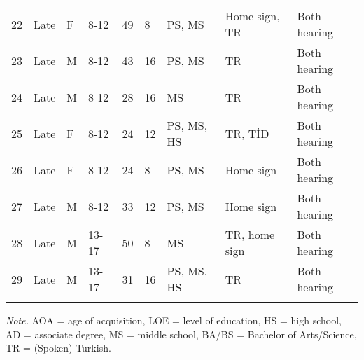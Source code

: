 \begin{appendix}
\begin{table}[h]
\begin{center}
\begin{threeparttable}
{\begin{tabular}{lllllllll}
22 & Late & F & 8-12 & 49 & 8 & PS, MS & Home sign, TR & Both hearing\\
23 & Late & M & 8-12 & 43 & 16 & PS, MS & TR & Both hearing\\
24 & Late & M & 8-12 & 28 & 16 & MS & TR & Both hearing\\
25 & Late & F & 8-12 & 24 & 12 & PS, MS, HS & TR, TİD & Both hearing\\
26 & Late & F & 8-12 & 24 & 8 & PS, MS & Home sign & Both hearing\\
27 & Late & M & 8-12 & 33 & 12 & PS, MS & Home sign & Both hearing\\
28 & Late & M & 13-17 & 50 & 8 & MS & TR, home sign & Both hearing\\
29 & Late & M & 13-17 & 31 & 16 & PS, MS, HS & TR & Both hearing\\
\bottomrule
\addlinespace
\end{tabular}

}

\begin{tablenotes}[para]
\normalsize{\textit{Note.} AOA = age of acquisition, LOE = level of education, HS = high school, AD = associate degree, MS = middle school, BA/BS = Bachelor of Arts/Science, TR = (Spoken) Turkish.}
\end{tablenotes}

\end{threeparttable}
\end{center}

\end{table}
\end{appendix}
